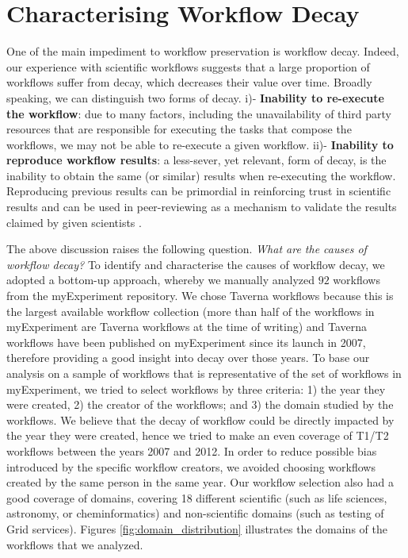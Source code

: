 \section{Characterising Workflow Decay}
\label{sec:decay}

One of the main impediment to workflow preservation is workflow decay. Indeed, our experience with scientific workflows suggests that a large proportion of workflows suffer from decay, which decreases their value over time. Broadly speaking, we can distinguish two forms of decay. i)- {\bf Inability to re-execute the workflow}: due to many factors, including the unavailability of third party resources that are responsible for executing the tasks that compose the workflows, we may not be able to re-execute a given workflow. ii)- {\bf Inability to reproduce workflow results}: a less-sever, yet relevant, form of decay, is the inability to obtain the same (or similar) results when re-executing the workflow. Reproducing previous results can be primordial in reinforcing trust in scientific results and can be used in peer-reviewing as a mechanism to validate the results claimed by given scientists \cite{DBLP:journals/pvldb/FreireBS11,carole2011}. 

The above discussion raises the following question. {\em What are the causes of workflow decay?} To identify and characterise the causes of workflow decay, we adopted a bottom-up approach, whereby we manually analyzed $92$ workflows from the myExperiment repository. We chose Taverna workflows because this is the largest available workflow collection (more than half of the workflows in myExperiment are Taverna workflows at the time of writing) and Taverna workflows have been published on myExperiment since its launch in 2007, therefore providing a good insight into decay over those years. 
To base our analysis on a sample of workflows that is representative of the set of workflows in myExperiment, we tried to select workflows by three criteria: 1) the year they were created, 2) the creator of the workflows; and 3) the domain studied by the workflows. We believe that the decay of workflow could be directly impacted by the year they were created, hence we tried to make an even coverage of T1/T2 workflows between the years 2007 and 2012. In order to reduce possible bias introduced by the specific workflow creators, we avoided choosing workflows created by the same person in the same year. Our workflow selection also had a good coverage of domains, covering 18 different scientific (such as life sciences, astronomy, or cheminformatics) and non-scientific domains (such as testing of Grid services).  Figures \ref{fig:domain_distribution} illustrates the domains of the workflows that we analyzed.
 
